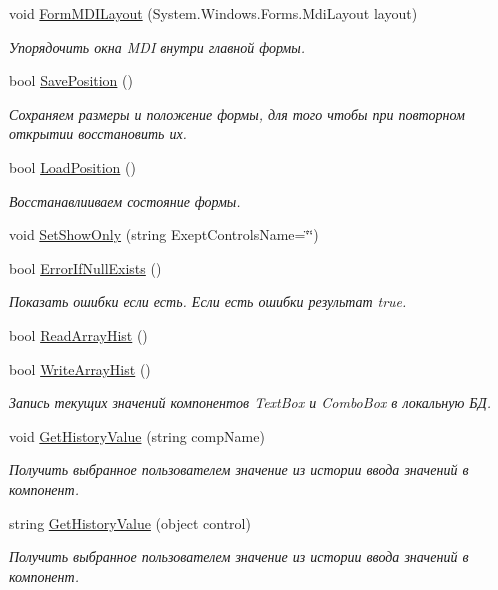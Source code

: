 \begin{DoxyCompactItemize}
void \mbox{\hyperlink{class_f_b_a_1_1_form_obj_ae1274b7643c0d9c1be6d4ad19e0382f9}{Form\+M\+D\+I\+Layout}} (System.\+Windows.\+Forms.\+Mdi\+Layout layout)
\begin{DoxyCompactList}\small\item\em Упорядочить окна M\+DI внутри главной формы. \end{DoxyCompactList}\item 
bool \mbox{\hyperlink{class_f_b_a_1_1_form_obj_ad381343106357bd57bf77be17a28a6a4}{Save\+Position}} ()
\begin{DoxyCompactList}\small\item\em Сохраняем размеры и положение формы, для того чтобы при повторном открытии восстановить их. \end{DoxyCompactList}\item 
bool \mbox{\hyperlink{class_f_b_a_1_1_form_obj_a056a98f36a377ae1299cb8b6dcfd9984}{Load\+Position}} ()
\begin{DoxyCompactList}\small\item\em Восстанавлииваем состояние формы. \end{DoxyCompactList}\item 
void \mbox{\hyperlink{class_f_b_a_1_1_form_obj_a3a17cfa388771610495eefd8bd46ec6c}{Set\+Show\+Only}} (string Exept\+Controls\+Name=\char`\"{}\char`\"{})
\item 
bool \mbox{\hyperlink{class_f_b_a_1_1_form_obj_a86ea9bb8599b17b13d42df644a2aaa32}{Error\+If\+Null\+Exists}} ()
\begin{DoxyCompactList}\small\item\em Показать ошибки если есть. Если есть ошибки результат true. \end{DoxyCompactList}\item 
bool \mbox{\hyperlink{class_f_b_a_1_1_form_obj_a7b0e24bdad1d8755e167f38545cdc7f2}{Read\+Array\+Hist}} ()
\item 
bool \mbox{\hyperlink{class_f_b_a_1_1_form_obj_abf5098c7b5dc3caf85a0922a1da59fd3}{Write\+Array\+Hist}} ()
\begin{DoxyCompactList}\small\item\em Запись текущих значений компонентов Text\+Box и Combo\+Box в локальную БД. \end{DoxyCompactList}\item 
void \mbox{\hyperlink{class_f_b_a_1_1_form_obj_a9871bab9051db11663e9ce108bf3f55c}{Get\+History\+Value}} (string comp\+Name)
\begin{DoxyCompactList}\small\item\em Получить выбранное пользователем значение из истории ввода значений в компонент. \end{DoxyCompactList}\item 
string \mbox{\hyperlink{class_f_b_a_1_1_form_obj_ab91f339c5542cd51067b8e94dbbdd2d0}{Get\+History\+Value}} (object control)
\begin{DoxyCompactList}\small\item\em Получить выбранное пользователем значение из истории ввода значений в компонент. \end{DoxyCompactList}\end{DoxyCompactItemize}
